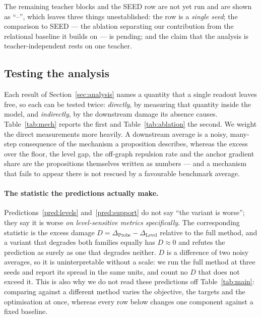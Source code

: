 The remaining teacher blocks and the SEED row are not yet run and are shown as ``--'', which
leaves three things unestablished: the \method row is a \emph{single seed}; the comparison
to SEED --- the ablation separating our contribution from the relational baseline it builds
on --- is pending; and the claim that the analysis is teacher-independent rests on one teacher.

\subsection{Testing the analysis}
\label{sec:exp:abl}

Each result of Section~\ref{sec:analysis} names a quantity that a single readout leaves
free, so each can be tested twice: \emph{directly}, by measuring that quantity inside the
model, and \emph{indirectly}, by the downstream damage its absence causes.
Table~\ref{tab:mech} reports the first and Table~\ref{tab:ablation} the second. We weight
the direct measurements more heavily. A downstream average is a noisy, many-step
consequence of the mechanism a proposition describes, whereas the excess over the floor,
the level gap, the off-graph repulsion rate and the anchor gradient share are the
propositions themselves written as numbers --- and a mechanism that fails to appear there
is not rescued by a favourable benchmark average.



\paragraph{The statistic the predictions actually make.}
Predictions~\ref{pred:levels} and~\ref{pred:support} do not say ``the variant is worse'';
they say it is worse \emph{on level-sensitive metrics specifically}. The corresponding
statistic is the excess damage
$D = \Delta_{\mathrm{Probe}} - \Delta_{\mathrm{Level}}$ relative to the full method, and a
variant that degrades both families equally has $D\approx 0$ and refutes the prediction as
surely as one that degrades neither. $D$ is a difference of two noisy averages, so it is
uninterpretable without a scale: we run the full method at three seeds and report its spread
in the same units, and count no $D$ that does not exceed it. This is also why we do not read
these predictions off Table~\ref{tab:main}: comparing against a different method varies the
objective, the targets and the optimisation at once, whereas every row below changes one
component against a fixed baseline.

